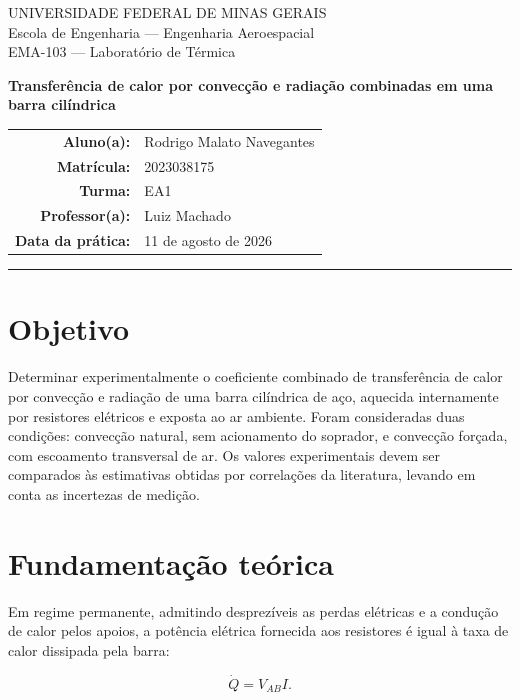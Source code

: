 \documentclass[11pt,a4paper]{article}
\newcommand{\aluno}{Rodrigo Malato Navegantes}
\newcommand{\matricula}{2023038175}
\newcommand{\turma}{EA1}
\newcommand{\professor}{Luiz Machado}
\newcommand{\dataexperimento}{11 de agosto de 2026}
\begin{document}
\begin{center}
  {\small UNIVERSIDADE FEDERAL DE MINAS GERAIS\\
  Escola de Engenharia --- Engenharia Aeroespacial\\
  EMA-103 --- Laboratório de Térmica}

  \vspace{1.1cm}

  {\LARGE\bfseries\color{azul}
  Transferência de calor por convecção e radiação combinadas em uma barra cilíndrica}

  \vspace{0.9cm}

  \begin{tabular}{@{}rl@{}}
    \textbf{Aluno(a):} & \aluno \\
    \textbf{Matrícula:} & \matricula \\
    \textbf{Turma:} & \turma \\
    \textbf{Professor(a):} & \professor \\
    \textbf{Data da prática:} & \dataexperimento
  \end{tabular}
\end{center}

\vspace{0.65cm}
\hrule

\section{Objetivo}

Determinar experimentalmente o coeficiente combinado de transferência de calor por convecção e radiação de uma barra cilíndrica de aço, aquecida internamente por resistores elétricos e exposta ao ar ambiente. Foram consideradas duas condições: convecção natural, sem acionamento do soprador, e convecção forçada, com escoamento transversal de ar. Os valores experimentais devem ser comparados às estimativas obtidas por correlações da literatura, levando em conta as incertezas de medição.

\section{Fundamentação teórica}

Em regime permanente, admitindo desprezíveis as perdas elétricas e a condução de calor pelos apoios, a potência elétrica fornecida aos resistores é igual à taxa de calor dissipada pela barra:

\begin{equation}
  \dot Q = V_{AB} I.
  \label{eq:potencia}
\end{equation}
\end{document}
